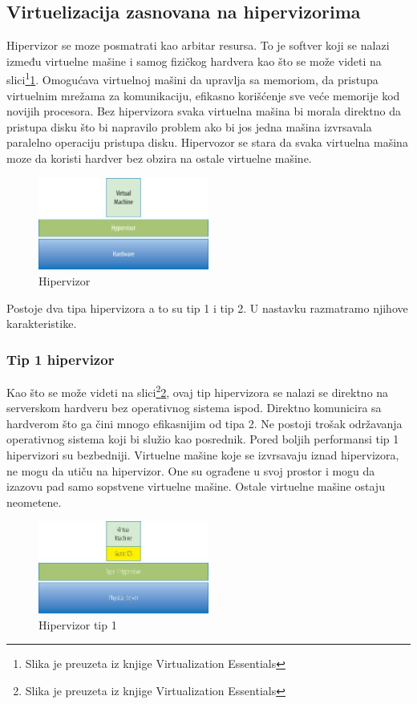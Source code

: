 \documentclass[12pt,oneside]{memoir}
\begin{document}
\subsection{Virtuelizacija zasnovana na hipervizorima}
Hipervizor se moze posmatrati kao arbitar resursa. To je softver koji se nalazi između virtuelne mašine i samog fizičkog hardvera kao što se može videti na slici\footnote{Slika je preuzeta iz knjige Virtualization Essentials}\ref{fig:hipervizor}. Omogućava virtuelnoj mašini da upravlja sa memoriom, da pristupa virtuelnim mrežama za komunikaciju, efikasno korišćenje sve veće memorije kod novijih procesora\cite{ve}. Bez hipervizora svaka virtuelna mašina bi morala direktno da pristupa disku što bi napravilo problem ako bi jos jedna mašina izvrsavala paralelno operaciju pristupa disku. Hipervozor se stara da svaka virtuelna mašina moze da koristi hardver bez obzira na ostale virtuelne mašine.
\begin{figure}[!ht]
  \centering
  \includegraphics[width=0.5\textwidth]{Slika 1.jpg}
  \caption{Hipervizor}
  \label{fig:hipervizor}
\end{figure}
 
Postoje dva tipa hipervizora a to su tip 1 i tip 2. U nastavku razmatramo njihove karakteristike.
 
\subsubsection{Tip 1 hipervizor}
Kao što se može videti na slici\footnote{Slika je preuzeta iz knjige Virtualization Essentials}\ref{fig:hipervizorTip1}, ovaj tip hipervizora se nalazi se direktno na serverskom hardveru bez operativnog sistema ispod. Direktno komunicira sa hardverom što ga čini mnogo efikasnijim od tipa 2. Ne postoji trošak održavanja operativnog sistema koji bi služio kao posrednik. Pored boljih performansi tip 1 hipervizori su bezbedniji. Virtuelne mašine koje se izvrsavaju iznad hipervizora, ne mogu da utiču na hipervizor. One su ograđene u svoj prostor i mogu da izazovu pad samo sopstvene virtuelne mašine. Ostale virtuelne mašine ostaju neometene.
\begin{figure}[!ht]
  \centering
  \includegraphics[width=0.5\textwidth]{Slika 2.jpg}
  \caption{Hipervizor tip 1}
  \label{fig:hipervizorTip1}
\end{figure}
 
\end{document}
